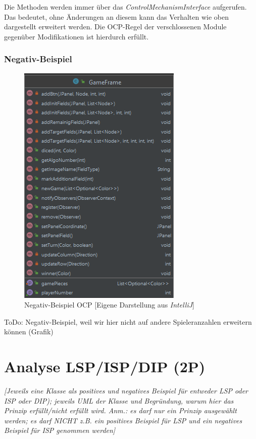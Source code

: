 Die Methoden werden immer über das \emph{ControlMechanismInterface} aufgerufen. Das bedeutet, ohne Änderungen an diesem kann das Verhalten wie oben dargestellt erweitert werden. Die OCP-Regel der verschlossenen Module gegenüber Modifikationen ist hierdurch erfüllt.

\subsubsection{Negativ-Beispiel}
\begin{figure}[htbp]
\centerline{\includegraphics[scale=.6]{negativbeispiel_ocp}}
\caption{Negativ-Beispiel OCP [Eigene Darstellung aus \emph{IntelliJ}]}
\label{fig:negativbeispiel_ocp}
\end{figure}
\noindent ToDo: Negativ-Beispiel, weil wir hier nicht auf andere Spieleranzahlen erweitern können (Grafik)

\newpage
\section{Analyse LSP/ISP/DIP (2P)}
\emph{[Jeweils eine Klasse als positives und negatives Beispiel für entweder LSP oder ISP oder DIP); jeweils
UML der Klasse und Begründung, warum hier das Prinzip erfüllt/nicht erfüllt wird. Anm.: es darf nur ein Prinzip ausgewählt werden; es darf NICHT z.B. ein positives Beispiel für LSP und ein negatives Beispiel für ISP genommen werden]}

